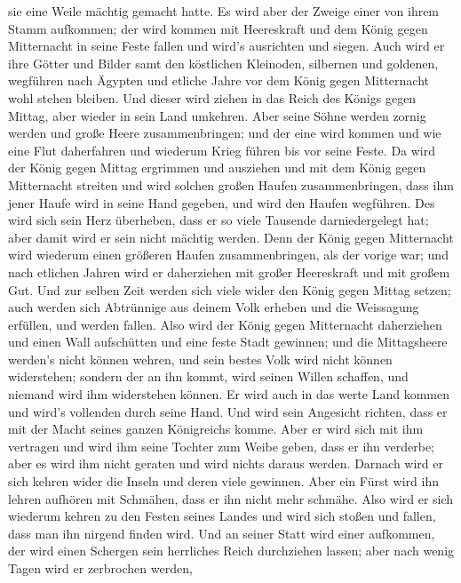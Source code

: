 sie eine Weile mächtig gemacht hatte.  Es wird aber der
Zweige einer von ihrem Stamm aufkommen; der wird kommen mit Heereskraft
und dem König gegen Mitternacht in seine Feste fallen und wird's
ausrichten und siegen.  Auch wird er ihre Götter und Bilder
samt den köstlichen Kleinoden, silbernen und goldenen, wegführen nach
Ägypten und etliche Jahre vor dem König gegen Mitternacht wohl stehen
bleiben.  Und dieser wird ziehen in das Reich des Königs
gegen Mittag, aber wieder in sein Land umkehren.  Aber
seine Söhne werden zornig werden und große Heere zusammenbringen; und
der eine wird kommen und wie eine Flut daherfahren und wiederum Krieg
führen bis vor seine Feste.  Da wird der König gegen Mittag
ergrimmen und ausziehen und mit dem König gegen Mitternacht streiten und
wird solchen großen Haufen zusammenbringen, dass ihm jener Haufe wird in
seine Hand gegeben,  und wird den Haufen wegführen. Des
wird sich sein Herz überheben, dass er so viele Tausende darniedergelegt
hat; aber damit wird er sein nicht mächtig werden.  Denn
der König gegen Mitternacht wird wiederum einen größeren Haufen
zusammenbringen, als der vorige war; und nach etlichen Jahren wird er
daherziehen mit großer Heereskraft und mit großem Gut.  Und
zur selben Zeit werden sich viele wider den König gegen Mittag setzen;
auch werden sich Abtrünnige aus deinem Volk erheben und die Weissagung
erfüllen, und werden fallen.  Also wird der König gegen
Mitternacht daherziehen und einen Wall aufschütten und eine feste Stadt
gewinnen; und die Mittagsheere werden's nicht können wehren, und sein
bestes Volk wird nicht können widerstehen;  sondern der an
ihn kommt, wird seinen Willen schaffen, und niemand wird ihm widerstehen
können. Er wird auch in das werte Land kommen und wird's vollenden durch
seine Hand.  Und wird sein Angesicht richten, dass er mit
der Macht seines ganzen Königreichs komme. Aber er wird sich mit ihm
vertragen und wird ihm seine Tochter zum Weibe geben, dass er ihn
verderbe; aber es wird ihm nicht geraten und wird nichts daraus werden.
 Darnach wird er sich kehren wider die Inseln und deren
viele gewinnen. Aber ein Fürst wird ihn lehren aufhören mit Schmähen,
dass er ihn nicht mehr schmähe.  Also wird er sich wiederum
kehren zu den Festen seines Landes und wird sich stoßen und fallen, dass
man ihn nirgend finden wird.  Und an seiner Statt wird
einer aufkommen, der wird einen Schergen sein herrliches Reich
durchziehen lassen; aber nach wenig Tagen wird er zerbrochen werden,

